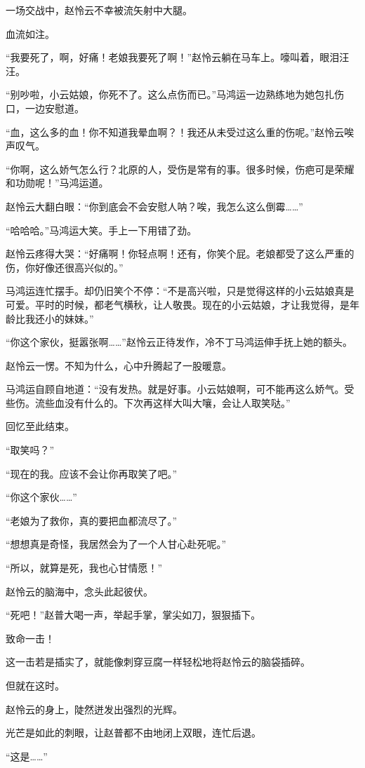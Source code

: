 \begin{this_body}
一场交战中，赵怜云不幸被流矢射中大腿。

血流如注。

“我要死了，啊，好痛！老娘我要死了啊！”赵怜云躺在马车上。嚎叫着，眼泪汪汪。

“别吵啦，小云姑娘，你死不了。这么点伤而已。”马鸿运一边熟练地为她包扎伤口，一边安慰道。

“血，这么多的血！你不知道我晕血啊？！我还从未受过这么重的伤呢。”赵怜云唉声叹气。

“你啊，这么娇气怎么行？北原的人，受伤是常有的事。很多时候，伤疤可是荣耀和功勋呢！”马鸿运道。

赵怜云大翻白眼：“你到底会不会安慰人呐？唉，我怎么这么倒霉……”

“哈哈哈。”马鸿运大笑。手上一下用错了劲。

赵怜云疼得大哭：“好痛啊！你轻点啊！还有，你笑个屁。老娘都受了这么严重的伤，你好像还很高兴似的。”

马鸿运连忙摆手。却仍旧笑个不停：“不是高兴啦，只是觉得这样的小云姑娘真是可爱。平时的时候，都老气横秋，让人敬畏。现在的小云姑娘，才让我觉得，是年龄比我还小的妹妹。”

“你这个家伙，挺嚣张啊……”赵怜云正待发作，冷不丁马鸿运伸手抚上她的额头。

赵怜云一愣。不知为什么，心中升腾起了一股暖意。

马鸿运自顾自地道：“没有发热。就是好事。小云姑娘啊，可不能再这么娇气。受些伤。流些血没有什么的。下次再这样大叫大嚷，会让人取笑哒。”

回忆至此结束。

“取笑吗？”

“现在的我。应该不会让你再取笑了吧。”

“你这个家伙……”

“老娘为了救你，真的要把血都流尽了。”

“想想真是奇怪，我居然会为了一个人甘心赴死呢。”

“所以，就算是死，我也心甘情愿！”

赵怜云的脑海中，念头此起彼伏。

“死吧！”赵普大喝一声，举起手掌，掌尖如刀，狠狠插下。

致命一击！

这一击若是插实了，就能像刺穿豆腐一样轻松地将赵怜云的脑袋插碎。

但就在这时。

赵怜云的身上，陡然迸发出强烈的光辉。

光芒是如此的刺眼，让赵普都不由地闭上双眼，连忙后退。

“这是……”


\end{this_body}
